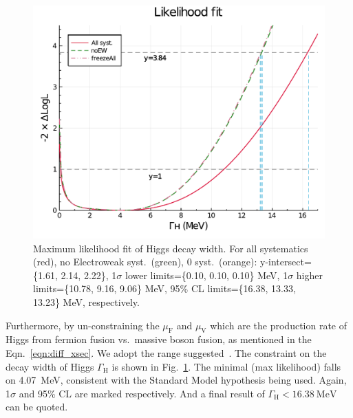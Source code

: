 \begin{figure}[h]
    \centering
    \includegraphics[width=.8\linewidth]{fig/Final_fit_width.pdf}
    \caption{Maximum likelihood fit of Higgs decay width. For all systematics (red), no Electroweak syst.~(green),
    0 syst.~(orange): y-intersect=\{1.61, 2.14, 2.22\}, 1$\sigma$ lower limits=\{0.10, 0.10, 0.10\} MeV,
1$\sigma$ higher limits=\{10.78, 9.16, 9.06\} MeV, 95\% CL limits=\{16.38, 13.33, 13.23\} MeV, respectively.}
\label{fig:final_fit_width}
\end{figure}
Furthermore, by un-constraining the $\mu_\mathrm{F}$ and $\mu_\mathrm{V}$ which are the production rate
of Higgs from fermion fusion vs.\ massive boson fusion, as mentioned in the Eqn.~\ref{eqn:diff_xsec}.
We adopt the range suggested~\cite{rfrv_higgs_pas}. The constraint on the decay width of Higgs $\Gamma_\mathrm{H}$ is shown in 
Fig.~\ref{fig:final_fit_width}. The minimal (max likelihood) falls on \SI{4.07}{\mega\electronvolt},
consistent with the Standard Model hypothesis being used. 
Again, 1$\sigma$ and 95\% CL are marked respectively. And a final result of 
$\Gamma_\mathrm{H}<\SI{16.38}{\mega\electronvolt}$ can be quoted.




